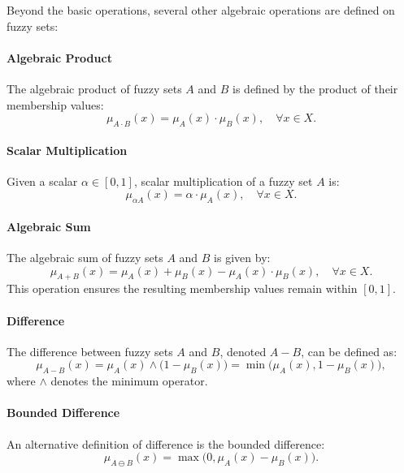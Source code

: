 Beyond the basic operations, several other algebraic operations are defined on fuzzy sets:

\paragraph{Algebraic Product}
The algebraic product of fuzzy sets \(A\) and \(B\) is defined by the product of their membership values:
\begin{equation}
    \mu_{A \cdot B}(x) = \mu_A(x) \cdot \mu_B(x), \quad \forall x \in X.
    \label{eq:algebraic_product}
\end{equation}

\paragraph{Scalar Multiplication}
Given a scalar \(\alpha \in [0,1]\), scalar multiplication of a fuzzy set \(A\) is:
\begin{equation}
    \mu_{\alpha A}(x) = \alpha \cdot \mu_A(x), \quad \forall x \in X.
    \label{eq:scalar_multiplication}
\end{equation}

\paragraph{Algebraic Sum}
The algebraic sum of fuzzy sets \(A\) and \(B\) is given by:
\begin{equation}
    \mu_{A + B}(x) = \mu_A(x) + \mu_B(x) - \mu_A(x) \cdot \mu_B(x), \quad \forall x \in X.
    \label{eq:algebraic_sum}
\end{equation}
This operation ensures the resulting membership values remain within \([0,1]\).

\paragraph{Difference}
The difference between fuzzy sets \(A\) and \(B\), denoted \(A - B\), can be defined as:
\begin{equation}
    \mu_{A - B}(x) = \mu_A(x) \wedge \big(1 - \mu_B(x)\big) = \min\big(\mu_A(x), 1 - \mu_B(x)\big),
    \label{eq:fuzzy_difference}
\end{equation}
where \(\wedge\) denotes the minimum operator.

\paragraph{Bounded Difference}
An alternative definition of difference is the bounded difference:
\begin{equation}
    \mu_{A \ominus B}(x) = \max\big(0, \mu_A(x) - \mu_B(x)\big).
    \label{eq:bounded_difference}
\end{equation}

